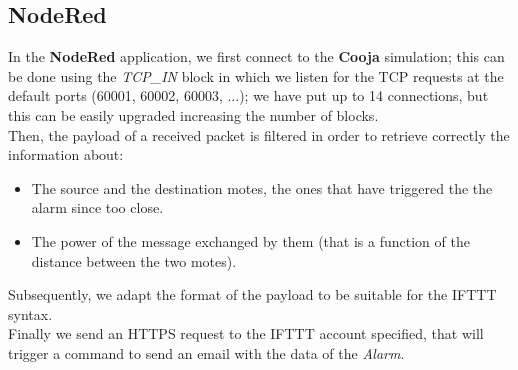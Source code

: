 \subsection{NodeRed}

In the \textbf{NodeRed} application, we first connect to the \textbf{Cooja} simulation; this can be done using the \textit{TCP\_IN} 
block in which we listen for the TCP requests at the default ports (60001, 60002, 60003, ...); 
we have put up to 14 connections, but this can be easily upgraded increasing the number of blocks.\\ 
Then, the payload of a received packet is filtered in order to retrieve correctly the information about: 
\begin{itemize}
    \item The source and the destination motes, the ones that have triggered the the alarm since too close.
    \item The power of the message exchanged by them (that is a function of the distance between the two motes).
\end{itemize}
Subsequently, we adapt the format of the payload to be suitable for the IFTTT syntax.\\
Finally we send an HTTPS request to the IFTTT account specified, that will trigger a command to send an email with the 
data of the \textit{Alarm}.